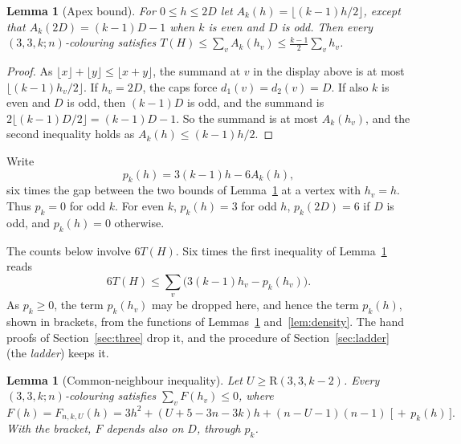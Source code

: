 \documentclass[11pt]{article}
\theoremstyle{spacedplain}
\newtheorem{lemma}[theorem]{Lemma}
\theoremstyle{spaceddef}
\theoremstyle{spacedremark}
\newcommand{\R}{\mathrm{R}}
\begin{document}
\begin{lemma}[Apex bound]\label{lem:apex}
For $0\le h\le 2D$ let $A_k(h)=\lfloor(k-1)h/2\rfloor$, except that $A_k(2D)=(k-1)D-1$ when $k$ is even and $D$ is odd.
Then every $(3,3,k;n)$-colouring satisfies $T(H)\le\sum_vA_k(h_v)\le\frac{k-1}{2}\sum_vh_v$.
\end{lemma}

\begin{proof}
As $\lfloor x\rfloor+\lfloor y\rfloor\le\lfloor x+y\rfloor$, the summand at $v$ in the display above is at most $\lfloor(k-1)h_v/2\rfloor$.
If $h_v=2D$, the caps force $d_1(v)=d_2(v)=D$.
If also $k$ is even and $D$ is odd, then $(k-1)D$ is odd, and the summand is $2\lfloor(k-1)D/2\rfloor=(k-1)D-1$.
So the summand is at most $A_k(h_v)$, and the second inequality holds as $A_k(h)\le(k-1)h/2$.
\end{proof}

Write
\[
p_k(h)=3(k-1)h-6A_k(h),
\]
six times the gap between the two bounds of Lemma~\ref{lem:apex} at a vertex with $h_v=h$.
Thus $p_k=0$ for odd $k$.
For even $k$, $p_k(h)=3$ for odd $h$, $p_k(2D)=6$ if $D$ is odd, and $p_k(h)=0$ otherwise.

The counts below involve $6T(H)$.
Six times the first inequality of Lemma~\ref{lem:apex} reads
\begin{equation}\label{eq:apex6}
6T(H)\le\sum_v\big(3(k-1)h_v-p_k(h_v)\big).
\end{equation}
As $p_k\ge 0$, the term $p_k(h_v)$ may be dropped here, and hence the term $p_k(h)$, shown in brackets, from the functions of Lemmas~\ref{lem:commonnbr} and~\ref{lem:density}.
The hand proofs of Section~\ref{sec:three} drop it, and the procedure of Section~\ref{sec:ladder} (the \emph{ladder}) keeps it.

\begin{lemma}[Common-neighbour inequality]\label{lem:commonnbr}
Let $U\ge\R(3,3,k-2)$.
Every $(3,3,k;n)$-colouring satisfies $\sum_vF(h_v)\le 0$, where
\[
F(h)=F_{n,k,U}(h)=3h^2+(U+5-3n-3k)h+(n-U-1)(n-1)\;\big[\,+\,p_k(h)\,\big].
\]
With the bracket, $F$ depends also on $D$, through $p_k$.
\end{lemma}
\end{document}
